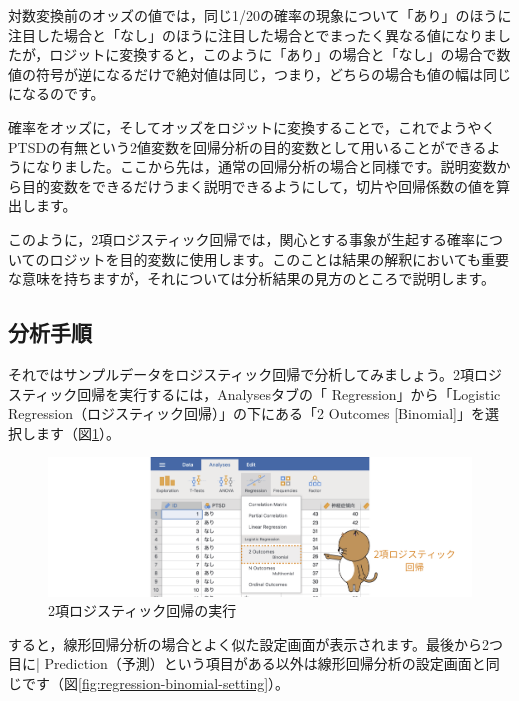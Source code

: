 \documentclass[
  12pt,
  a5jpaper,
  lualatex, ja=standard]{bxjsbook}
\newcommand{\infig}[1]{\raisebox{-.2\zh}{\texttt{[image: images/assets/\#1]}}}
\begin{document}
対数変換前のオッズの値では，同じ1/20の確率の現象について「あり」のほうに注目した場合と「なし」のほうに注目した場合とでまったく異なる値になりましたが，ロジットに変換すると，このように「あり」の場合と「なし」の場合で数値の符号が逆になるだけで絶対値は同じ，つまり，どちらの場合も値の幅は同じになるのです。

確率をオッズに，そしてオッズをロジットに変換することで，これでようやくPTSDの有無という2値変数を回帰分析の目的変数として用いることができるようになりました。ここから先は，通常の回帰分析の場合と同様です。説明変数から目的変数をできるだけうまく説明できるようにして，切片や回帰係数の値を算出します。

このように，2項ロジスティック回帰では，関心とする事象が生起する確率についてのロジットを目的変数に使用します。このことは結果の解釈においても重要な意味を持ちますが，それについては分析結果の見方のところで説明します。

\hypertarget{sub:regression-binomial-analysis}{%
\subsection{分析手順}\label{sub:regression-binomial-analysis}}

それではサンプルデータをロジスティック回帰で分析してみましょう。2項ロジスティック回帰を実行するには，Analysesタブの「\infig{analysis-regression.pdf} Regression」から「Logistic Regression（ロジスティック回帰）」の下にある「2 Outcomes {[}Binomial{]}」を選択します（図\ref{fig:regression-binomial-menu}）。

\begin{figure}[!ht]

{\centering \includegraphics[width=1\linewidth]{images/regression/binomial-menu} 

}

\caption{2項ロジスティック回帰の実行}\label{fig:regression-binomial-menu}
\end{figure}

すると，線形回帰分析の場合とよく似た設定画面が表示されます。最後から2つ目に\colorbox{bar}{\textcolor{gmoji2}{| Prediction}}（予測）という項目がある以外は線形回帰分析の設定画面と同じです（図\ref{fig:regression-binomial-setting}）。
\end{document}
